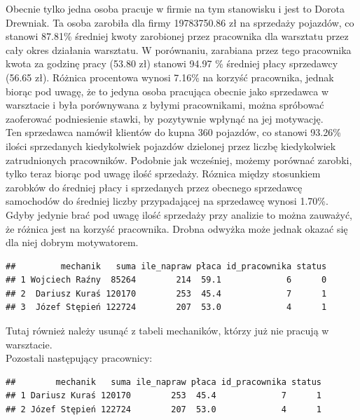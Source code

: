 \documentclass{article}\usepackage[]{graphicx}\usepackage[]{xcolor}
\makeatletter
\newenvironment{kframe}{%
 \def\at@end@of@kframe{}%
 \ifinner\ifhmode%
  \def\at@end@of@kframe{\end{minipage}}%
  \begin{minipage}{\columnwidth}%
 \fi\fi%
 \def\FrameCommand##1{\hskip\@totalleftmargin \hskip-\fboxsep
 \colorbox{shadecolor}{##1}\hskip-\fboxsep
     \hskip-\linewidth \hskip-\@totalleftmargin \hskip\columnwidth}%
 \MakeFramed {\advance\hsize-\width
   \@totalleftmargin\z@ \linewidth\hsize
   \@setminipage}}%
 {\par\unskip\endMakeFramed%
 \at@end@of@kframe}
\newenvironment{knitrout}{}{} %
\makeatother
\begin{document}
Obecnie tylko jedna osoba pracuje w firmie na tym stanowisku i jest to Dorota Drewniak. Ta osoba zarobiła dla firmy 19783750.86 zł na sprzedaży pojazdów, co stanowi 87.81\% średniej kwoty zarobionej przez pracownika dla warsztatu przez cały okres działania warsztatu. W porównaniu, zarabiana przez tego pracownika kwota za godzinę pracy (53.80 zł) stanowi 94.97 \% średniej płacy sprzedawcy (56.65 zł). Różnica procentowa wynosi 7.16\% na korzyść pracownika, jednak biorąc pod uwagę, że to jedyna osoba pracująca obecnie jako sprzedawca w warsztacie i była porównywana z byłymi pracownikami, można spróbować zaoferować podniesienie stawki, by pozytywnie wpłynąć na jej motywację. \\

Ten sprzedawca namówił klientów do kupna 360 pojazdów, co stanowi 93.26\% ilości sprzedanych kiedykolwiek pojazdów dzielonej przez liczbę kiedykolwiek zatrudnionych pracowników. Podobnie jak wcześniej, możemy porównać zarobki, tylko teraz biorąc pod uwagę ilość sprzedaży. Róznica między stosunkiem zarobków do średniej płacy i sprzedanych przez obecnego sprzedawcę samochodów do średniej liczby przypadającej na sprzedawcę  wynosi 1.70\%. Gdyby jedynie brać pod uwagę ilość sprzedaży przy analizie to można zauważyć, że różnica jest na korzyść pracownika. Drobna odwyżka może jednak okazać się dla niej dobrym motywatorem. 

\begin{knitrout}
\color{fgcolor}\begin{kframe}
\begin{verbatim}
##         mechanik   suma ile_napraw płaca id_pracownika status
## 1 Wojciech Raźny  85264        214  59.1             6      0
## 2  Dariusz Kuraś 120170        253  45.4             7      1
## 3  Józef Stępień 122724        207  53.0             4      1
\end{verbatim}
\end{kframe}
\end{knitrout}


Tutaj również należy usunąć z tabeli mechaników, którzy już nie pracują w warsztacie. \\

Pozostali następujący pracownicy:

\begin{knitrout}
\color{fgcolor}\begin{kframe}
\begin{verbatim}
##        mechanik   suma ile_napraw płaca id_pracownika status
## 1 Dariusz Kuraś 120170        253  45.4             7      1
## 2 Józef Stępień 122724        207  53.0             4      1
\end{verbatim}
\end{kframe}
\end{knitrout}
\end{document}

